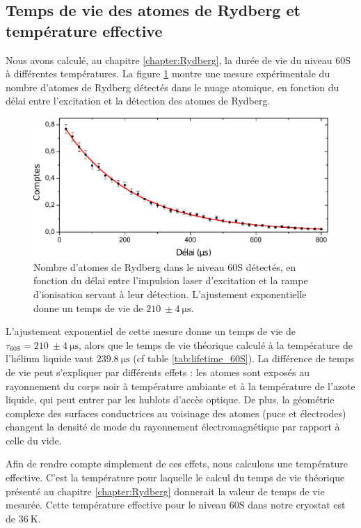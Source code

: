 \subsection{Temps de vie des atomes de Rydberg et température effective}
\noindent Nous avons calculé, au chapitre \ref{chapter:Rydberg}, la durée de vie du niveau $\mathrm{60S}$ à différentes températures.
La figure \ref{fig:lifetime_60S} montre une mesure expérimentale du nombre d'atomes de Rydberg détectés dans le nuage atomique, en fonction du délai entre l'excitation et la détection des atomes de Rydberg.
%
\begin{figure}[h]
\centering
\includegraphics[width=0.8\linewidth]{figures/setup/rydberg/lifetime_60S}
\caption[Durée de vie du niveau 60S]{
Nombre d'atomes de Rydberg dans le niveau $\mathrm{60S}$ détectés, en fonction du délai entre l'impulsion laser d'excitation et la rampe d'ionisation servant à leur détection.
L'ajustement exponentielle donne un temps de vie de $\SI{210}{} \pm \SI{4}{\us}$.
}
\label{fig:lifetime_60S}
\end{figure}
%
L'ajustement exponentiel de cette mesure donne un temps de vie de $\tau_{\mathrm{60S}} = \SI{210}{} \pm \SI{4}{\us}$, alors que le temps de vie théorique calculé à la température de l'hélium liquide vaut $\SI{239.8}{\us}$ (cf table \ref{tab:lifetime_60S}).
La différence de temps de vie peut s'expliquer par différents effets :
les atomes sont exposés au rayonnement du corps noir à température ambiante et à la température de l'azote liquide, qui peut entrer par les hublots d'accès optique.
De plus, la géométrie complexe des surfaces conductrices au voisinage des atomes (puce et électrodes) changent la densité de mode du rayonnement électromagnétique par rapport à celle du vide.

Afin de rendre compte simplement de ces effets, nous calculons une température effective.
C'est la température pour laquelle le calcul du temps de vie théorique présenté au chapitre \ref{chapter:Rydberg} donnerait la valeur de temps de vie mesurée.
Cette température effective pour le niveau $\mathrm{60S}$ dans notre cryostat est de $\SI{36}{\kelvin}$.


